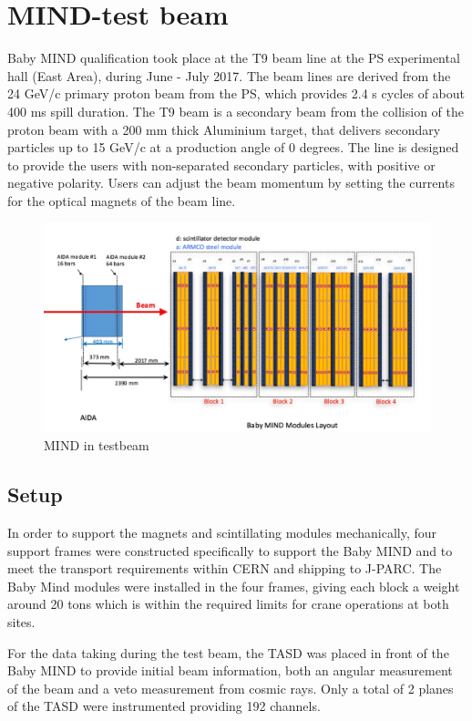 \pagebreak
\section{MIND-test beam}

Baby MIND qualification took place at the T9 beam line at the PS experimental hall (East Area), during June - July 2017. The beam lines are derived from the 24 GeV/c primary proton beam from the PS, which provides 2.4 s cycles of about 400 ms spill duration. The T9 beam is a secondary beam from the collision of the proton beam with a 200 mm thick Aluminium target, that delivers secondary particles up to 15 GeV/c at a production angle of 0 degrees. The line is designed to provide the users with non-separated secondary particles, with positive or negative polarity. Users can adjust the beam momentum by setting the currents for the optical magnets of the beam line.

\begin{figure}[h!]
\centering
\includegraphics[width=\textwidth]{figures/MINDAIDAtestbeam.jpeg}
\caption{MIND in testbeam}
\label{fig:MINDtb}
\end{figure}

\subsection{Setup}

In order to support the magnets and scintillating modules mechanically, four support frames were constructed specifically to support the Baby MIND and  to meet the transport requirements within CERN and shipping to J-PARC. The Baby Mind modules were installed in the four frames, giving each block a weight around 20 tons which is within the required limits for crane operations at both sites.

For the data taking during the test beam, the TASD was placed in front of the Baby MIND to provide initial beam information, both an angular measurement of the beam and a veto measurement from cosmic rays. Only a total of 2 planes of the TASD were instrumented providing 192 channels. 

